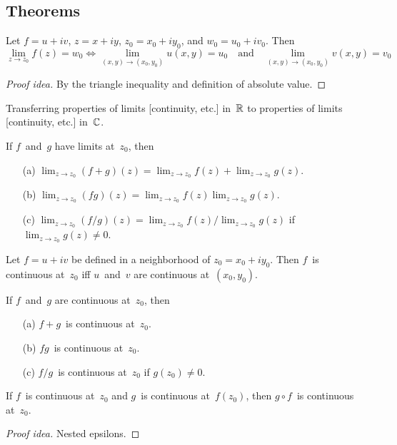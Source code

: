 \subsection*{Theorems}
\begin{thm}[Limits]
Let \(f=u+iv\), \(z=x+iy\), \(z_0=x_0+iy_0\), and \(w_0=u_0+iv_0\). Then
\[\lim_{z\to z_0}f(z)=w_0\iff\lim_{(x,y)\to(x_0,y_0)}u(x,y)=u_0\quad\text{and}\quad\lim_{(x,y)\to(x_0,y_0)}v(x,y)=v_0\]
\end{thm}
\begin{proof}[Proof idea]
By the triangle inequality and definition of absolute value.
\end{proof}
\begin{app}
Transferring properties of limits [continuity, etc.] in~\(\mathbb{R}\) to properties of limits [continuity, etc.] in~\(\mathbb{C}\).
\end{app}
\begin{cor}
If \(f\)~and~\(g\) have limits at~\(z_0\), then
\begin{enumerate}[itemsep=0pt]
\item[(a)] \(\lim_{z\to z_0}(f+g)(z)=\lim_{z\to z_0}f(z)+\lim_{z\to z_0}g(z)\).
\item[(b)] \(\lim_{z\to z_0}(fg)(z)=\lim_{z\to z_0}f(z)\lim_{z\to z_0}g(z)\).
\item[(c)] \(\lim_{z\to z_0}(f/g)(z)=\lim_{z\to z_0}f(z)/\lim_{z\to z_0}g(z)\) if \(\lim_{z\to z_0}g(z)\ne0\).
\end{enumerate}
\end{cor}

\begin{cor}[Continuity]
Let \(f=u+iv\) be defined in a neighborhood of \(z_0=x_0+iy_0\). Then \(f\)~is continuous at~\(z_0\) iff \(u\)~and~\(v\) are continuous at~\((x_0,y_0)\).
\end{cor}

\begin{cor}
If \(f\)~and~\(g\) are continuous at~\(z_0\), then
\begin{enumerate}[itemsep=0pt]
\item[(a)] \(f+g\)~is continuous at~\(z_0\).
\item[(b)] \(fg\)~is continuous at~\(z_0\).
\item[(c)] \(f/g\)~is continuous at~\(z_0\) if \(g(z_0)\ne0\).
\end{enumerate}
\end{cor}

\begin{thm}
If \(f\)~is continuous at~\(z_0\) and \(g\)~is continuous at~\(f(z_0)\), then \(g\circ f\)~is continuous at~\(z_0\).
\end{thm}
\begin{proof}[Proof idea]
Nested epsilons.
\end{proof}

